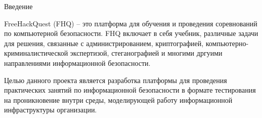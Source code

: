 \begin{center}
Введение
\end{center}

FreeHackQuest (FHQ) -- это платформа для обучения и проведения соревнований по компьютерной безопасности. FHQ включает в себя учебник, различные задачи для решения, связанные с администрированием, криптографией, компьютерно-криминалистической экспертизой, стеганографией и многими дргуими направлениями информационной безопасности. \par

Целью данного проекта является разработка платформы для проведения практических занятий по информационной безопасности в формате тестирования на проникновение внутри среды, моделирующей работу информационной инфраструктуры организации.\par 

\clearpage
